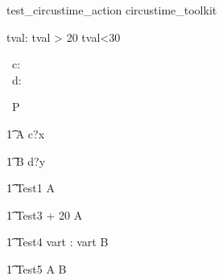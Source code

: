 \begin{zsection}
   \SECTION test\_circustime\_action \parents circustime\_toolkit
\end{zsection}


\begin{axdef}
   tval: \nat
\where
   tval > 20 \land tval<30
\end{axdef}


\begin{circus}
    \circchannel\ c: \nat \\
    \circchannel\ d: \nat \\
\end{circus}

\begin{circus}
    \circprocess\ P \circdef \circbegin \\
\end{circus}


\begin{circusaction}
    	\t1 A \circdef c?x \then \Skip \\
\end{circusaction}

\begin{circusaction}
        \t1 B \circdef d?y \then \Skip \\
\end{circusaction}

\begin{circusaction}
   \t1 Test1 \circdef  {} \rcirctime \circstartby A  \\
\end{circusaction}


\begin{circusaction}
   \t1 Test3 \circdef  {} + 20 \rcirctime \circstartby A  \\
\end{circusaction}

\begin{circusaction}
   \t1 Test4 \circdef \circvres vart : \nat  \circspot  \lcirctime vart \rcirctime \circstartby B \\
\end{circusaction}


\begin{circusaction}
   \t1 Test5 \circdef  {} \rcirctime \circstartby A  \circseq B\\
\end{circusaction}

